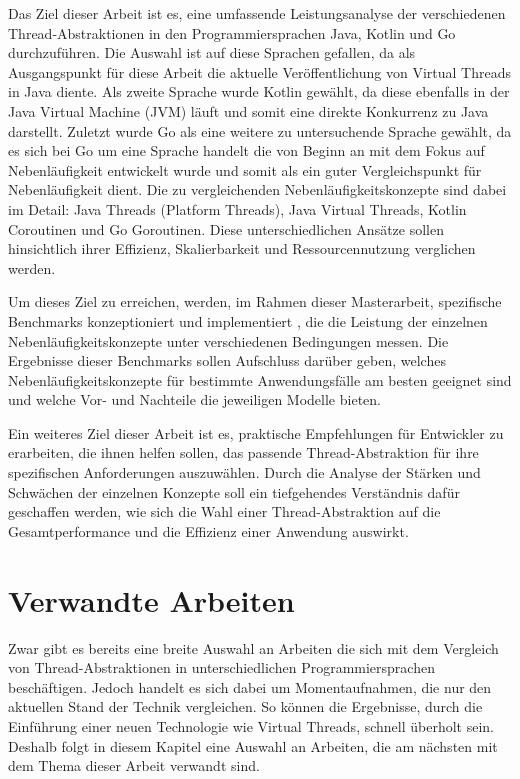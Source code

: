 \documentclass[fontsize=12pt,paper=a4,twoside=semi,parskip=half-,headsepline,headinclude]{scrreprt}
\begin{document}
Das Ziel dieser Arbeit ist es, eine umfassende Leistungsanalyse der verschiedenen Thread-Abstraktionen in den Programmiersprachen Java, Kotlin und Go durchzuführen. Die Auswahl ist auf diese Sprachen gefallen, da als Ausgangspunkt für diese Arbeit die aktuelle Veröffentlichung von Virtual Threads in Java diente. Als zweite Sprache wurde Kotlin gewählt, da diese ebenfalls in der Java Virtual Machine (JVM) läuft und somit eine direkte Konkurrenz zu Java darstellt. Zuletzt wurde Go als eine weitere zu untersuchende Sprache gewählt, da es sich bei Go um eine Sprache handelt die von Beginn an mit dem Fokus auf Nebenläufigkeit entwickelt wurde und somit als ein guter Vergleichspunkt für Nebenläufigkeit dient. Die zu vergleichenden Nebenläufigkeitskonzepte sind dabei im Detail: Java Threads (Platform Threads), Java Virtual Threads, Kotlin Coroutinen und Go Goroutinen. Diese unterschiedlichen Ansätze sollen hinsichtlich ihrer Effizienz, Skalierbarkeit und Ressourcennutzung verglichen werden.

Um dieses Ziel zu erreichen, werden, im Rahmen dieser Masterarbeit, spezifische Benchmarks konzeptioniert und implementiert , die die Leistung der einzelnen Neben\-läufig\-keits\-konzepte unter verschiedenen Bedingungen messen. Die Ergebnisse dieser Benchmarks sollen Aufschluss darüber geben, welches Nebenläufigkeitskonzepte für bestimmte Anwendungsfälle am besten geeignet sind und welche Vor- und Nachteile die jeweiligen Modelle bieten.

Ein weiteres Ziel dieser Arbeit ist es, praktische Empfehlungen für Entwickler zu erarbeiten, die ihnen helfen sollen, das passende Thread-Abstraktion für ihre spezifischen Anforderungen auszuwählen. Durch die Analyse der Stärken und Schwächen der einzelnen Konzepte soll ein tiefgehendes Verständnis dafür geschaffen werden, wie sich die Wahl einer Thread-Abstraktion auf die Gesamtperformance und die Effizienz einer Anwendung auswirkt.

\section{Verwandte Arbeiten}

Zwar gibt es bereits eine breite Auswahl an Arbeiten die sich mit dem Vergleich von Thread-Abstraktionen in unterschiedlichen Programmiersprachen beschäftigen. Jedoch handelt es sich dabei um Momentaufnahmen, die nur den aktuellen Stand der Technik vergleichen. So können die Ergebnisse, durch die Einführung einer neuen Technologie wie Virtual Threads, schnell überholt sein. Deshalb folgt in diesem Kapitel eine Auswahl an Arbeiten, die am nächsten mit dem Thema dieser Arbeit verwandt sind.
\end{document}
